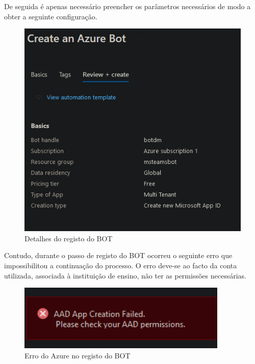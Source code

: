 De seguida é apenas necessário preencher os parâmetros necessários de modo a obter
a seguinte configuração.

\begin{figure}[H]
\begin{center}
\includegraphics[width=14cm]{figs/detalhes do bot.png}
\caption{Detalhes do registo do BOT}
\label{fig:bookstack}
\end{center}
\end{figure}


Contudo, durante o passo de registo do BOT ocorreu o seguinte erro que impossibilitou
a continuação do processo. O erro deve-se ao facto da conta utilizada, associada à 
instituição de ensino, não ter as permissões necessárias.

\begin{figure}[H]
\begin{center}
\includegraphics[width=10cm]{figs/erro bot azure.png}
\caption{Erro do Azure no registo do BOT}
\label{fig:bookstack}
\end{center}
\end{figure}



